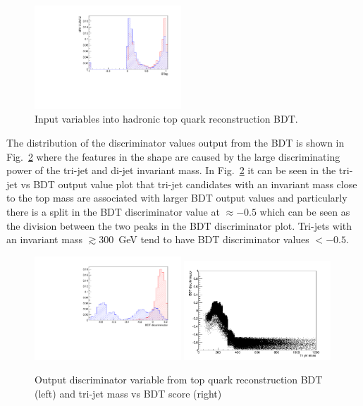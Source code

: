 \begin{figure}[ht!]
     \includegraphics[width=0.49\textwidth]{images/Run1/BTag.pdf}          
    \caption{Input variables into hadronic top quark reconstruction BDT.}
    \label{fig:TopBDTinput}
\end{figure}

The distribution of the discriminator values output from the BDT is shown in Fig.~\ref{fig:TopBDToutput} where the features in the shape are caused by the large discriminating power of the tri-jet and di-jet invariant mass. In Fig.~\ref{fig:TopBDToutput} it can be seen in the tri-jet vs BDT output value plot that tri-jet candidates with an invariant mass close to the top mass are associated with larger BDT output values and particularly there is a split in the BDT discriminator value at $\approx -0.5$ which can be seen as the division between the two peaks in the BDT discriminator plot. Tri-jets with an invariant mass $\gtrsim 300$~GeV tend to have BDT discriminator values $< -0.5$.

\begin{figure}[!ht]
\centering
    \includegraphics[width=0.49\textwidth]{images/Run1/BDT_Disc.pdf}
    \includegraphics[width=0.49\textwidth]{images/Run1/TrijetmassVsBDT.png}
    \caption{Output discriminator variable from top quark reconstruction BDT (left) and tri-jet mass vs BDT score (right)}
    \label{fig:TopBDToutput}
\end{figure}

